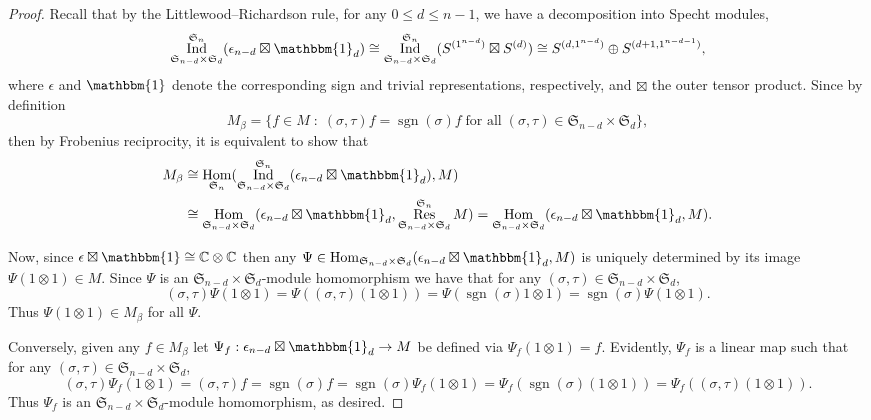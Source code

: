\documentclass[11pt, noadjust, reqno]{amsart}
\theoremstyle{definition}
\theoremstyle{remark}
\numberwithin{equation}{section}
\newcommand{\0}{\emptyset}
\newcommand{\C}{\mathbb{C}}
\renewcommand{\S}{\mathfrak{S}}
\DeclareMathOperator{\sgn}{sgn}
\DeclareMathOperator{\Hom}{Hom}
\DeclareMathOperator{\Ind}{Ind}
\DeclareMathOperator{\Res}{Res}
\begin{document}
\begin{proof}
Recall that by the Littlewood--Richardson rule, for any $0 \leq d \leq n-1$, we have a decomposition into Specht modules, 
\[
\Ind_{\mathfrak{S}_{n-d} \times \mathfrak{S}_d}^{\mathfrak{S}_n}(\epsilon_{n-d} \boxtimes \mathbbm{1}_d) \cong \Ind_{\mathfrak{S}_{n-d} \times \mathfrak{S}_d}^{\mathfrak{S}_n}(S^{(1^{n-d})} \boxtimes S^{(d)})\cong S^{(d,1^{n-d})} \oplus S^{(d+1,1^{n-d-1})},
\]
where $\epsilon$ and $\mathbbm{1}$ denote the corresponding sign and trivial representations, respectively, and $\boxtimes$ the outer tensor product. Since by definition 
\[
M_\beta = \{ f \in M \; :\; (\sigma,\tau)f = \sgn(\sigma)f \;\text{for all} \;    (\sigma,\tau) \in \mathfrak{S}_{n-d} \times \mathfrak{S}_d\},
\]
then by Frobenius reciprocity, it is equivalent to show that
\begin{align*}
M_\beta
 &\cong 
 \Hom_{\S_n} (
\Ind_{\mathfrak{S}_{n-d} \times \mathfrak{S}_d}^{\mathfrak{S}_n}(\epsilon_{n-d} \boxtimes \mathbbm{1}_d), M)\\
&\cong
\Hom_{\mathfrak{S}_{n-d} \times \mathfrak{S}_d} (
\epsilon_{n-d} \boxtimes \mathbbm{1}_d, \Res_{\mathfrak{S}_{n-d} \times \mathfrak{S}_d}^{\mathfrak{S}_n}M)
= \Hom_{\mathfrak{S}_{n-d} \times \mathfrak{S}_d} (
\epsilon_{n-d} \boxtimes \mathbbm{1}_d, M).
\end{align*}

Now, since $\epsilon \boxtimes \mathbbm{1} \cong \C \otimes \C$ then any $\Psi \in \Hom_{\mathfrak{S}_{n-d} \times \mathfrak{S}_d} (
\epsilon_{n-d} \boxtimes \mathbbm{1}_d, M)$ is uniquely determined by its image $\Psi(1\otimes 1) \in M$. Since $\Psi$ is an $\mathfrak{S}_{n-d} \times \mathfrak{S}_d$-module homomorphism we have that for any $(\sigma,\tau) \in \mathfrak{S}_{n-d} \times \mathfrak{S}_d$, 
\[
(\sigma,\tau)\Psi(1\otimes 1)=
\Psi((\sigma,\tau)(1\otimes 1)) = \Psi(\sgn(\sigma)1\otimes 1) = \sgn(\sigma)\Psi(1\otimes 1).
\]
Thus $\Psi(1\otimes 1) \in M_\beta$ for all $\Psi$.

Conversely, given any $f \in M_\beta$ let $\Psi_f: \epsilon_{n-d} \boxtimes \mathbbm{1}_d  \to M$ be defined via $\Psi_f(1 \otimes 1) =f$. Evidently, $\Psi_f$ is a linear map such that for any $(\sigma,\tau) \in \mathfrak{S}_{n-d} \times \mathfrak{S}_d$, 
\[
(\sigma,\tau)\Psi_f(1 \otimes 1) = (\sigma,\tau)f = \sgn(\sigma) f = \sgn(\sigma)  \Psi_f(1 \otimes 1) =   \Psi_f(\sgn(\sigma)(1 \otimes 1)) = \Psi_f((\sigma,\tau)(1\otimes 1)).
\]
Thus $\Psi_f$ is an $\mathfrak{S}_{n-d} \times \mathfrak{S}_d$-module homomorphism, as desired. 


\end{proof}
\end{document}
